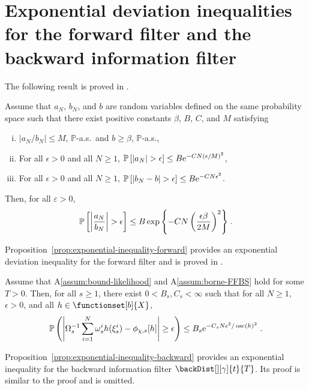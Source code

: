 \section{Exponential deviation inequalities for the forward filter and the backward information filter}
\label{sec:appendix:expdev}The following result is proved in \cite{douc:garivier:moulines:olsson:2011}.
\begin{lem}
\label{lem:hoeffding:ratio}
Assume that $a_N$, $b_N$, and $b$ are random variables defined on the same probability space such that there exist positive constants $\beta$, $B$, $C$, and $M$ satisfying
\begin{enumerate}[(i)]
    \item \label{it:bound:ab} $|a_N/b_N|\leq M$, $\mathbb{P}$-a.s.\ and  $b \geq \beta$, $\mathbb{P}$-a.s.,
    \item \label{it:hoeff:a} For all $\epsilon>0$ and all $N\geq1$, $\mathbb{P} \left[ |a_N|>\epsilon \right]\leq B \rme^{-C N \left(\epsilon/M\right)^2}$,
    \item \label{it:hoeff:b} For all $\epsilon>0$ and all $N\geq1$, $\mathbb{P}\left[|b_N-b|>\epsilon \right]\leq B \rme^{-C N \epsilon^2}$.
\end{enumerate}
Then, for all $\varepsilon>0$,
\[
\mathbb{P}\left[ \left| \frac{a_N}{b_N} \right| > \epsilon \right] \leq B \exp{\left\{-C N \left(\frac{\epsilon \beta}{2M} \right)^2 \right\}} \;.
\]
\end{lem}

Proposition~\ref{prop:exponential-inequality-forward} provides an exponential deviation inequality for the forward filter and is proved in \cite{douc:garivier:moulines:olsson:2011}.
\begin{prop}
\label{prop:exponential-inequality-forward}
Assume that A\ref{assum:bound-likelihood} and A\ref{assum:borne-FFBS} hold for some $T > 0$. Then, for all $s\geq 1$,
there exist $0 <B_s, C_s <\infty$ such that for all $N\ge 1$, $\epsilon > 0$, and all $h \in \functionset[b]{X}$,
\begin{equation*}
\PP\left( \left| \sumwght{s}^{-1 } \sum_{i=1}^N \swght{s}{i} h(\epartpred{s}{i}) - \filt{\Xinit,s}[h] \right| \geq \epsilon \right) \leq B_s \rme^{-C_s N \epsilon^2 / \oscnorm{h}^2}\eqsp.
\end{equation*}
\end{prop}

Proposition~\ref{prop:exponential-inequality-backward} provides an exponential inequality for the backward information filter $\backDist[][\gamma]{t}{T}$. Its proof is similar to the proof \cite[Theorem~5]{douc:garivier:moulines:olsson:2011} and is omitted.

